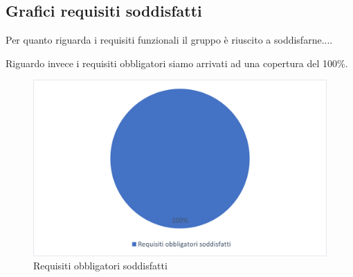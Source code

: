 \subsection{Grafici requisiti soddisfatti}
Per quanto riguarda i requisiti funzionali il gruppo \groupName{} è riuscito a soddisfarne....

Riguardo invece i requisiti obbligatori siamo arrivati ad una copertura del 100\%.
\begin{figure}[htbp]
   \begin{center}
    \includegraphics{immagini/requisiti_obbligatori.png}
    \caption{Requisiti obbligatori soddisfatti}
   \end{center}
\end{figure}    

